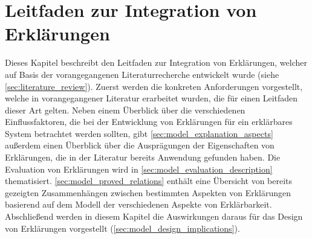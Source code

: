 \chapter{Leitfaden zur Integration von Erklärungen}
\label{ch:explanation_guideline}

Dieses Kapitel beschreibt den Leitfaden zur Integration von Erklärungen, welcher auf Basis der vorangegangenen Literaturrecherche entwickelt wurde (siehe \autoref{sec:literature_review}). Zuerst werden die konkreten Anforderungen vorgestellt, welche in vorangegangener Literatur erarbeitet wurden, die für einen Leitfaden dieser Art gelten. Neben einem Überblick über die verschiedenen Einflussfaktoren, die bei der Entwicklung von Erklärungen für ein erklärbares System betrachtet werden sollten, gibt \autoref{sec:model_explanation_aspects} außerdem einen Überblick über die Ausprägungen der Eigenschaften von Erklärungen, die in der Literatur bereits Anwendung gefunden haben. Die Evaluation von Erklärungen wird in \autoref{sec:model_evaluation_description} thematisiert. \autoref{sec:model_proved_relations} enthält eine Übersicht von bereits gezeigten Zusammenhängen zwischen bestimmten Aspekten von Erklärungen basierend auf dem Modell der verschiedenen Aspekte von Erklärbarkeit. Abschließend werden in diesem Kapitel die Auswirkungen daraus für das Design von Erklärungen vorgestellt (\autoref{sec:model_design_implications}).








